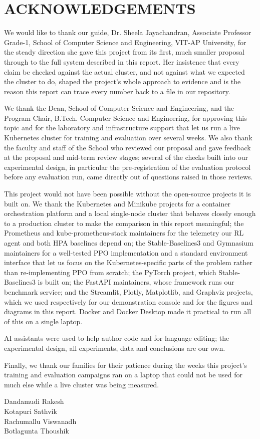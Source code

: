 \chapter*{\centering ACKNOWLEDGEMENTS}
\label{ch:acknowledgements}

We would like to thank our guide, Dr. Sheela Jayachandran, Associate
Professor Grade-1, School of Computer Science and Engineering, VIT-AP
University, for the steady direction she gave this project from its first,
much smaller proposal through to the full system described in this report.
Her insistence that every claim be checked against the actual cluster, and
not against what we expected the cluster to do, shaped the project's whole
approach to evidence and is the reason this report can trace every number
back to a file in our repository.

We thank the Dean, School of Computer Science and Engineering, and the
Program Chair, B.Tech. Computer Science and Engineering, for approving this
topic and for the laboratory and infrastructure support that let us run a
live Kubernetes cluster for training and evaluation over several weeks. We
also thank the faculty and staff of the School who reviewed our proposal and
gave feedback at the proposal and mid-term review stages; several of the
checks built into our experimental design, in particular the pre-registration
of the evaluation protocol before any evaluation run, came directly out of
questions raised in those reviews.

This project would not have been possible without the open-source projects it
is built on. We thank the Kubernetes and Minikube projects for a container
orchestration platform and a local single-node cluster that behaves closely
enough to a production cluster to make the comparison in this report
meaningful; the Prometheus and kube-prometheus-stack maintainers for the
telemetry our RL agent and both HPA baselines depend on; the Stable-Baselines3
and Gymnasium maintainers for a well-tested PPO implementation and a standard
environment interface that let us focus on the Kubernetes-specific parts of
the problem rather than re-implementing PPO from scratch; the PyTorch project,
which Stable-Baselines3 is built on; the FastAPI maintainers, whose framework
runs our benchmark service; and the Streamlit, Plotly, Matplotlib, and
Graphviz projects, which we used respectively for our demonstration console
and for the figures and diagrams in this report. Docker and Docker Desktop
made it practical to run all of this on a single laptop.

AI assistants were used to help author code and for language editing; the
experimental design, all experiments, data and conclusions are our own.

Finally, we thank our families for their patience during the weeks this
project's training and evaluation campaigns ran on a laptop that could not be
used for much else while a live cluster was being measured.

\vspace{1.0cm}
\noindent
Dandamudi Rakesh\\
Kotapuri Sathvik\\
Rachumallu Viswanadh\\
Botlagunta Thoushik
